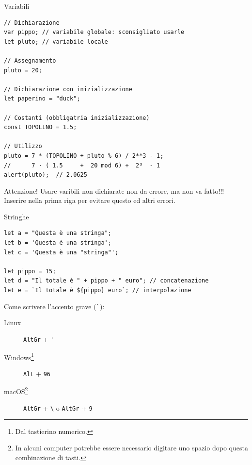 \begin{frame}[fragile]{Variabili}\transfade\centering
  \begin{verbatim}
// Dichiarazione
var pippo; // variabile globale: sconsigliato usarle
let pluto; // variabile locale

// Assegnamento
pluto = 20;

// Dichiarazione con inizializzazione
let paperino = "duck";

// Costanti (obbligatria inizializzazione)
const TOPOLINO = 1.5;

// Utilizzo
pluto = 7 * (TOPOLINO + pluto % 6) / 2**3 - 1;
//      7 · ( 1.5     +  20 mod 6) ÷  2³  - 1
alert(pluto);  // 2.0625
  \end{verbatim}
  \pause
  \alert{Attenzione!} Usare varibili non dichiarate non da errore, ma non va fatto!!!\\
  Inserire nella prima riga  per evitare questo ed altri errori.\\
\end{frame}

\begin{frame}[fragile]{Stringhe}\transfade\centering
  \begin{verbatim}
let a = "Questa è una stringa";
let b = 'Questa è una stringa';
let c = 'Questa è una "stringa"';

let pippo = 15;
let d = "Il totale è " + pippo + " euro"; // concatenazione
let e = `Il totale è ${pippo} euro`; // interpolazione
  \end{verbatim}
  \bigskip
  Come scrivere l'accento grave (\texttt{\`}):
  \begin{description}
    \item[Linux] \texttt{AltGr} + \texttt{\'}
    \item[Windows\footnote{Dal tastierino numerico.}] \texttt{Alt} + \texttt{96}
    \item[macOS\footnote{In alcuni computer potrebbe essere necessario digitare uno spazio dopo questa combinazione di tasti.}] \texttt{AltGr} + \texttt{\textbackslash} o \texttt{AltGr} + \texttt{9}
  \end{description}
\end{frame}


